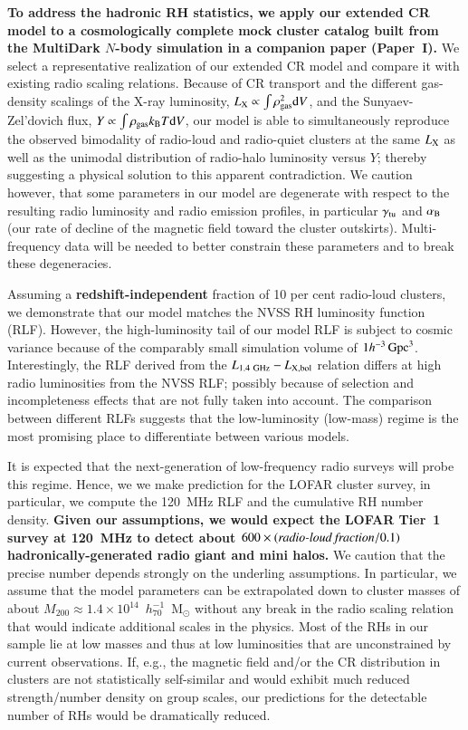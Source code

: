 \documentclass[useAMS,usenatbib]{mn2e}
\newcommand{\dd}{\mathrm{d}}
\begin{document}
{\bf To address the hadronic RH statistics, we apply our extended CR model 
to a cosmologically complete mock cluster catalog built from the MultiDark
$N$-body simulation in a companion paper (Paper~I).} We select a representative 
realization of our extended CR model and compare it with existing radio scaling relations. 
Because of CR transport and the different gas-density scalings of the X-ray luminosity,
$L_{\rmn{X}}\propto\int \rho_\rmn{gas}^2 \dd V$, and the Sunyaev-Zel'dovich
flux, $Y\propto\int \rho_{\rmn{gas}} k_{\rmn{B}} T \dd V$, our model is able to
simultaneously reproduce the observed bimodality of radio-loud and radio-quiet
clusters at the same $L_{{\mathrm{X}}}$ as well as the unimodal distribution of
radio-halo luminosity versus $Y$; thereby suggesting a physical solution to this
apparent contradiction. We caution however, that some parameters in our model
are degenerate with respect to the resulting radio luminosity and radio emission
profiles, in particular $\gamma_{{\mathrm{tu}}}$ and $ \alpha_{{\mathrm{B}}}$ (our rate of decline
of the magnetic field toward the cluster outskirts). Multi-frequency data will
be needed to better constrain these parameters and to break these degeneracies.

Assuming a {\bf redshift-independent} fraction of 10 per cent radio-loud
clusters, we demonstrate that our model matches the NVSS RH luminosity function
(RLF). However, the high-luminosity tail of our model RLF is subject to cosmic
variance because of the comparably small simulation volume of $1 h^{-3}
\,{\mathrm{Gpc}}^3$. Interestingly, the RLF derived from the
$L_{1.4~{\mathrm{GHz}}}-L_{{\mathrm{X,bol}}}$ relation differs at high radio luminosities
from the NVSS RLF; possibly because of selection and incompleteness effects that
are not fully taken into account. The comparison between different RLFs suggests
that the low-luminosity (low-mass) regime is the most promising place to
differentiate between various models.

It is expected that the next-generation of low-frequency radio surveys will
probe this regime. Hence, we we make prediction for the LOFAR cluster survey, in
particular, we compute the 120~MHz RLF and the cumulative RH number
density. {\bf Given our assumptions, we would expect the LOFAR Tier~1 survey at
120~MHz to detect about $600\times ({\mathrm{\emph{radio-loud~fraction}/0.1}})$ 
hadronically-generated radio giant and mini halos.} 
We caution that the precise number depends strongly on the underling assumptions. 
In particular, we assume that the model parameters can be extrapolated down to cluster 
masses of about $M_{200}\approx1.4\times10^{14}$~$h_{70}^{-1}$~M$_{\odot}$ without 
any break in the radio scaling relation that would indicate additional scales in the physics.
Most of the RHs in our sample lie at low masses and thus at low luminosities
that are unconstrained by current observations. If, e.g., the magnetic field
and/or the CR distribution in clusters are not statistically self-similar and
would exhibit much reduced strength/number density on group scales, our
predictions for the detectable number of RHs would be dramatically reduced.
\end{document}
